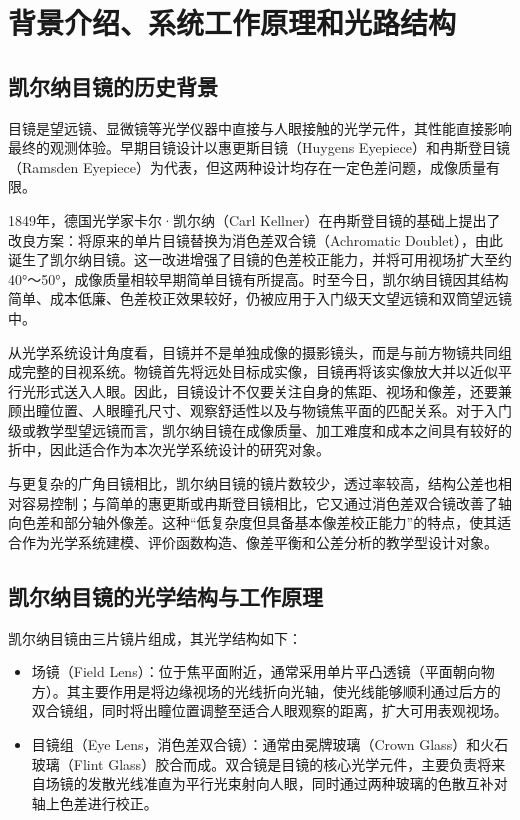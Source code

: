 \section{背景介绍、系统工作原理和光路结构}

\subsection{凯尔纳目镜的历史背景}

目镜是望远镜、显微镜等光学仪器中直接与人眼接触的光学元件，其性能直接影响最终的观测体验。早期目镜设计以惠更斯目镜（Huygens Eyepiece）和冉斯登目镜（Ramsden Eyepiece）为代表，但这两种设计均存在一定色差问题，成像质量有限。

1849年，德国光学家卡尔·凯尔纳（Carl Kellner）在冉斯登目镜的基础上提出了改良方案：将原来的单片目镜替换为消色差双合镜（Achromatic Doublet），由此诞生了凯尔纳目镜。这一改进增强了目镜的色差校正能力，并将可用视场扩大至约40°～50°，成像质量相较早期简单目镜有所提高\cite{Kingslake2010,Smith2008,Rutten2002}。时至今日，凯尔纳目镜因其结构简单、成本低廉、色差校正效果较好，仍被应用于入门级天文望远镜和双筒望远镜中。

从光学系统设计角度看，目镜并不是单独成像的摄影镜头，而是与前方物镜共同组成完整的目视系统。物镜首先将远处目标成实像，目镜再将该实像放大并以近似平行光形式送入人眼。因此，目镜设计不仅要关注自身的焦距、视场和像差，还要兼顾出瞳位置、人眼瞳孔尺寸、观察舒适性以及与物镜焦平面的匹配关系。对于入门级或教学型望远镜而言，凯尔纳目镜在成像质量、加工难度和成本之间具有较好的折中，因此适合作为本次光学系统设计的研究对象。

与更复杂的广角目镜相比，凯尔纳目镜的镜片数较少，透过率较高，结构公差也相对容易控制；与简单的惠更斯或冉斯登目镜相比，它又通过消色差双合镜改善了轴向色差和部分轴外像差。这种“低复杂度但具备基本像差校正能力”的特点，使其适合作为光学系统建模、评价函数构造、像差平衡和公差分析的教学型设计对象。

\subsection{凯尔纳目镜的光学结构与工作原理}

凯尔纳目镜由三片镜片组成，其光学结构如下：

\begin{itemize}
\item
  场镜（Field Lens）：位于焦平面附近，通常采用单片平凸透镜（平面朝向物方）。其主要作用是将边缘视场的光线折向光轴，使光线能够顺利通过后方的双合镜组，同时将出瞳位置调整至适合人眼观察的距离，扩大可用表观视场。
\item
  目镜组（Eye Lens，消色差双合镜）：通常由冕牌玻璃（Crown Glass）和火石玻璃（Flint Glass）胶合而成。双合镜是目镜的核心光学元件，主要负责将来自场镜的发散光线准直为平行光束射向人眼，同时通过两种玻璃的色散互补对轴上色差进行校正。
\end{itemize}

